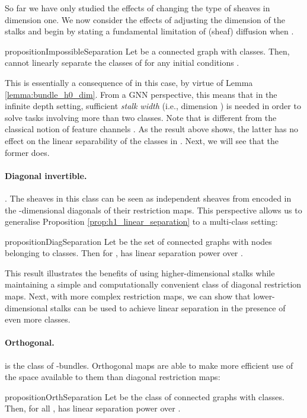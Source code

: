\documentclass{article}
\begin{document}
So far we have only studied the effects of changing the type of sheaves in dimension one. We now consider the effects of adjusting the dimension of the stalks and begin by stating a fundamental limitation of (sheaf) diffusion when . 
\begin{restatable}{proposition}{ImpossibleSeparation}\label{prop:impossible_separation}
Let  be a connected graph with  classes. Then,  cannot linearly separate the classes of  for any initial conditions . 
\end{restatable}
This is essentially a consequence of   in this case, by virtue of Lemma \ref{lemma:bundle_h0_dim}. From a GNN perspective, this means that in the infinite depth setting, sufficient \emph{stalk width} (i.e., dimension ) is needed in order to solve tasks involving more than two classes. Note that  is different from the classical notion of feature channels . As the result above shows, the latter has no effect on the linear separability of the classes in . Next, we will see that the former does. 


\paragraph*{Diagonal invertible.}
. 
The sheaves in this class can be seen as  independent sheaves from  encoded in the -dimensional diagonals of their restriction maps. This perspective allows us to generalise Proposition \ref{prop:h1_linear_separation} to a multi-class setting: 
\begin{restatable}{proposition}{DiagSeparation}\label{prop:diag_separation}
Let  be the set of connected graphs with nodes belonging to  classes. Then for ,  has linear separation power over .  
\end{restatable}
This result illustrates the benefits of using higher-dimensional stalks while maintaining a simple and computationally convenient class of diagonal restriction maps. Next, with more complex restriction maps, we can show that lower-dimensional stalks can be used to achieve linear separation in the presence of even more classes. 

\paragraph*{Orthogonal.}

 is the class of -bundles. 
Orthogonal maps are able to make more efficient use of the space available to them than diagonal restriction maps: 

\begin{restatable}{proposition}{OrthSeparation}\label{theo:orth_separation}
Let  be the class of connected graphs with  classes. Then, for all ,  has linear separation power over .  
\end{restatable}
\end{document}
